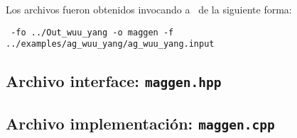 Los archivos fueron obtenidos invocando a \maggen\ de la siguiente forma:

\begin{center}
\footnotesize
\texttt{\maggen\ -fo ../Out\_wuu\_yang -o maggen -f  ../examples/ag\_wuu\_yang/ag\_wuu\_yang.input}
\end{center}

\subsection*{Archivo interface: \texttt{maggen.hpp}}



\subsection*{Archivo implementación: \texttt{maggen.cpp}}



\normalsize